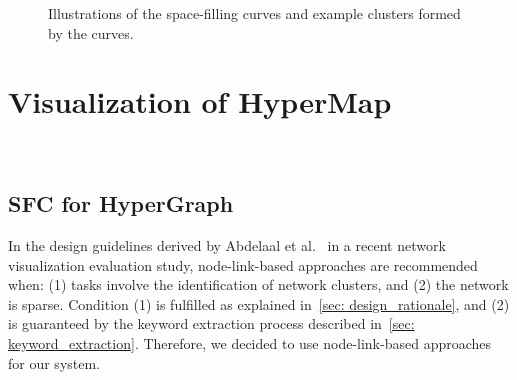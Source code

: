 \begin{figure}%
    \centering
    \qquad
    \qquad
    \qquad
    \captionsetup{belowskip=-14pt,aboveskip=3pt}
    \caption{
        Illustrations of the space-filling curves and example clusters formed by the curves.
    }%
    \label{fig: gilbert}%
\end{figure}
\vspace*{-0.3cm}
\section{Visualization of HyperMap}~\label{sec: visualization}
\vspace*{-0.6cm}
\subsection{SFC for HyperGraph}
In the design guidelines derived by Abdelaal et al.~\cite{abdelaal2022network} in a recent network visualization evaluation study, node-link-based approaches are recommended when:
(1) tasks involve the identification of network clusters, and (2) the network is sparse.
Condition (1) is fulfilled as explained in~\autoref{sec: design_rationale}, and (2) is guaranteed by the keyword extraction process described in~\autoref{sec: keyword_extraction}. 
Therefore, we decided to use node-link-based approaches for our system.


